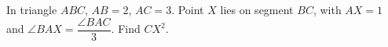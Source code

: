 In triangle $ABC$, $AB=2$, $AC=3$. Point $X$ lies on segment $BC$, with $AX=1$ and $\angle BAX=\dfrac{\angle BAC}{3}$. Find $CX^2$.
